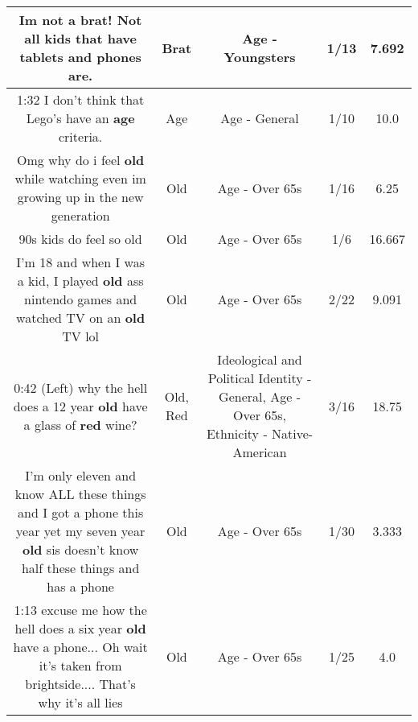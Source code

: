 \documentclass[11pt]{article}
\newlength\mylength
\begin{document}
\begin{center}
\begin{longtable}{|C{.65\mylength}|C{.30\mylength}|C{.12\mylength}|C{.12\mylength}|C{.12\mylength}|}
  \small Im not a \textbf{brat}! Not all kids that have tablets and phones are.\normalsize   & Brat & Age - Youngsters & 1/13 & 7.692 \\  \hline
  \small 1:32 I don't think that Lego's have an \textbf{age} criteria.\normalsize   & Age & Age - General & 1/10 & 10.0 \\  \hline
  \small Omg why do i feel \textbf{old} while watching even im growing up in the new generation\normalsize   & Old & Age - Over 65s & 1/16 & 6.25 \\  \hline
  \small 90s kids do feel so old\normalsize   & Old & Age - Over 65s & 1/6 & 16.667 \\  \hline
  \small I'm 18 and when I was a kid, I played \textbf{old} ass nintendo games and watched TV on an \textbf{old} TV lol\normalsize   & Old & Age - Over 65s & 2/22 & 9.091 \\  \hline
  \small 0:42 (Left) why the hell does a 12 year \textbf{old} have a glass of \textbf{r\textbf{ed}} wine?\normalsize   & Old, Red &  Ideological and Political Identity - General, Age - Over 65s, Ethnicity - Native-American & 3/16 & 18.75 \\  \hline
  \small I'm only eleven and know ALL these things and I got a phone this year yet my seven year \textbf{old} sis doesn't know half these things and has a phone\normalsize   & Old & Age - Over 65s & 1/30 & 3.333 \\  \hline
  \small 1:13 excuse me how the hell does a six year \textbf{old} have a phone... Oh wait it's taken from brightside.... That's why it's all lies\normalsize   & Old & Age - Over 65s & 1/25 & 4.0 \\  \hline

\end{longtable}
\end{center}
\end{document}
